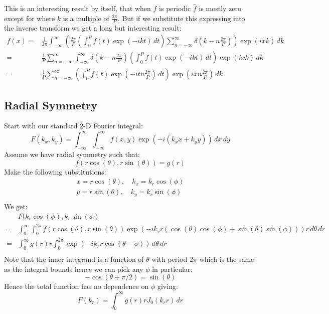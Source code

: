 This is an interesting result by itself, that when $f$ is periodic $\hat{f}$ is mostly zero except for where $k$ is a multiple of $\frac{2\pi}{P}$.
But if we substitute this expressing into the inverse transform we get a long but interesting result:
\begin{equation*}
\begin{aligned}
	f(x) =& \frac{1}{2\pi}\int_{-\infty}^{\infty}\left(\frac{2\pi}{P}\left(\int_{0}^{P}f(t)\exp(-ikt)\,dt\right)\sum_{n=-\infty}^{\infty}\delta\left(k-n\frac{2\pi}{P}\right)\right)\exp(ixk)\,dk\\
	      =&\frac{1}{P}\sum_{n=-\infty}^{\infty}\int_{-\infty}^{\infty}\delta\left(k-n\frac{2\pi}{P}\right)\left(\int_{0}^{P}f(t)\exp(-ikt)\,dt\right)\exp(ixk)\,dk \\
	      =&\frac{1}{P}\sum_{n=-\infty}^{\infty}\left(\int_{0}^{P}f(t)\exp(-itn\frac{2\pi}{P})\,dt\right)\exp\left(ixn\frac{2\pi}{P}\right)\,dk
\end{aligned}
\end{equation*}

\subsection{Radial Symmetry}
Start with our standard 2-D Fourier integral:
\[F(k_x,k_y) = \int_{-\infty}^{\infty}\int_{-\infty}^{\infty}f(x,y)\exp(-i(k_x x + k_y y))\,dx\,dy\]
Assume we have radial symmetry such that:
\[f(r\cos(\theta),r\sin(\theta)) = g(r)\]
Make the following substitutions:
\begin{equation*}
\begin{aligned}
	x = r\cos(\theta),\quad k_x = k_r\cos(\phi) \\
	y = r\sin(\theta),\quad k_y = k_r\sin(\phi)\\
\end{aligned}
\end{equation*}
We get:
\begin{equation*}
\begin{aligned}
	&F(k_r\cos(\phi),k_r\sin(\phi)  \\
	=& \int_0^\infty\int_0^{2\pi}f(r\cos(\theta),r\sin(\theta))\exp(-ik_r r(\cos(\theta)\cos(\phi)+\sin(\theta)\sin(\phi)))r\,d\theta\,dr\\
	=& \int_0^\infty g(r)r\int_0^{2\pi}\exp(-ik_r r\cos(\theta-\phi))\,d\theta\,dr \\
\end{aligned}
\end{equation*}
Note that the inner integrand is a function of $\theta$ with period $2\pi$ which is the same as the integral bounds hence we can pick any $\phi$ in particular:
\[-\cos(\theta +\pi/2) = \sin(\theta)\]
Hence the total function has no dependence on $\phi$ giving:
\[F(k_r) = \int_0^\infty g(r)rJ_0(k_r r)\,dr\]

